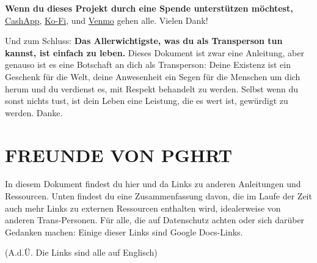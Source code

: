 \documentclass{article}
\begin{document}
\textbf{Wenn du dieses Projekt durch eine Spende unterstützen möchtest,} \href{https://cash.app/Katitties}{CashApp}, \href{https://ko-fi.com/katitties}{Ko-Fi}, und \href{https://account.venmo.com/u/katitties}{Venmo} gehen alle. Vielen Dank!

Und zum Schluss: \textbf{Das Allerwichtigste, was du als Transperson tun kannst, ist einfach zu leben.} Dieses Dokument ist zwar eine Anleitung, aber genauso ist es eine Botschaft an dich als Transperson: Deine Existenz ist ein Geschenk für die Welt, deine Anwesenheit ein Segen für die Menschen um dich herum und du verdienst es, mit Respekt behandelt zu werden. Selbst wenn du sonst nichts tust, ist dein Leben eine Leistung, die es wert ist, gewürdigt zu werden. Danke.

\section*{FREUNDE VON PGHRT}\label{FOPGHRT}

In diesem Dokument findest du hier und da Links zu anderen Anleitungen und Ressourcen. Unten findest du eine Zusammenfassung davon, die im Laufe der Zeit auch mehr Links zu externen Ressourcen enthalten wird, idealerweise von anderen Trans-Personen. Für alle, die auf Datenschutz achten oder sich darüber Gedanken machen: Einige dieser Links sind Google Docs-Links.

(A.d.Ü. Die Links sind alle auf Englisch)
\end{document}
